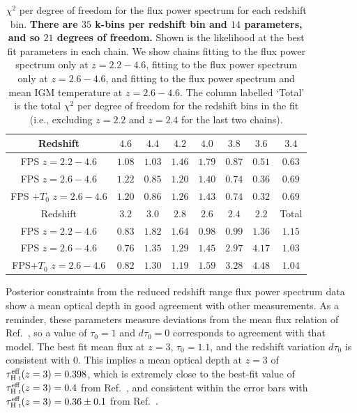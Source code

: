 \begin{table}
	\centering
     \def\arraystretch{1.2}
     \begin{tabular}{|c|c|c|c|c|c|c|c|}
		\hline
		Redshift & $4.6$ & $4.4$ & $4.2$ & $4.0$ & $3.8$ & $3.6$ & $3.4$\\
		\hline
        FPS $z= 2.2-4.6$ & $1.08$ & $1.03$ & $1.46$ & $1.79$ & $0.87$ & $0.51$ & $0.63$ \\
        FPS $z= 2.6-4.6$ & $1.22$ & $0.85$ & $1.20$ & $1.40$ & $0.74$ & $0.36$ & $0.69$\\
        FPS $+ T_0$ $z= 2.6-4.6$ & $1.20$ & $0.86$ & $1.26$ & $1.43$ & $0.74$ & $0.32$ & $0.69$ \\
        \hline
        Redshift & $3.2$ & $3.0$ & $2.8$ & $2.6$ & $2.4$ & $2.2$ & Total \\
		\hline
        FPS $z= 2.2-4.6$ & $0.83$ & $1.82$ & $1.64$ & $0.98$ & $0.99$ & $1.36$ & $1.15$ \\
        FPS $z= 2.6-4.6$ & $0.76$ & $1.35$ & $1.29$ & $1.45$ & $2.97$ & $4.17$ & $1.03$ \\
        FPS$ + T_0$ $z= 2.6-4.6$ & $0.82$ & $1.30$ & $1.19$ & $1.59$ & $3.28$ & $4.48$ & $1.04$\\
  \hline
	\end{tabular}
    \caption{\label{table:chi2}
    $\chi^2$ per degree of freedom for the flux power spectrum for each redshift bin. \textbf{There are $35$ k-bins per redshift bin and $14$ parameters, and so $21$ degrees of freedom.}
    Shown is the likelihood at the best fit parameters in each chain.
    We show chains fitting to the flux power spectrum only at $z=2.2-4.6$, fitting to the flux power spectrum only at $z=2.6-4.6$, and fitting to the flux power spectrum and mean IGM temperature at $z=2.6-4.6$.
    The column labelled `Total' is the total $\chi^2$ per degree of freedom for the redshift bins in the fit (i.e., excluding $z=2.2$ and $z=2.4$ for the last two chains).}
\end{table}

Posterior constraints from the reduced redshift range flux power spectrum data show a mean optical depth in good agreement with other measurements.
As a reminder, these parameters measure deviations from the mean flux relation of Ref.~\cite{2007MNRAS.382.1657K}, so a value of $\tau_0=1$ and $d\tau_0=0$ corresponds to agreement with that model.
The best fit mean flux at $z=3$, $\tau_0 = 1.1$, and the redshift variation $d\tau_0$ is consistent with $0$.
This implies a mean optical depth at $z=3$ of $\tau^{\text{eff}}_{\text{H~{\sc i}}}(z=3) = 0.398$, which is extremely close to the best-fit value of $\tau^{\text{eff}}_{\text{H~{\sc i}}}(z=3) = 0.4$ from Ref.~\cite{2013MNRAS.430.2067B}, and consistent within the error bars with $\tau^{\text{eff}}_{\text{H~{\sc i}}}(z=3) = 0.36 \pm 0.1$ from Ref.~\cite{2007MNRAS.382.1657K}. 

